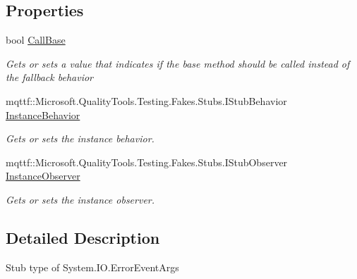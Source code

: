 \subsection*{Properties}
\begin{DoxyCompactItemize}
\item 
bool \hyperlink{class_system_1_1_i_o_1_1_fakes_1_1_stub_error_event_args_a805b5644284b21c3e82295740c538afe}{Call\-Base}
\begin{DoxyCompactList}\small\item\em Gets or sets a value that indicates if the base method should be called instead of the fallback behavior\end{DoxyCompactList}\item 
mqttf\-::\-Microsoft.\-Quality\-Tools.\-Testing.\-Fakes.\-Stubs.\-I\-Stub\-Behavior \hyperlink{class_system_1_1_i_o_1_1_fakes_1_1_stub_error_event_args_a21004becf5bc545d9a6894bc17245af5}{Instance\-Behavior}
\begin{DoxyCompactList}\small\item\em Gets or sets the instance behavior.\end{DoxyCompactList}\item 
mqttf\-::\-Microsoft.\-Quality\-Tools.\-Testing.\-Fakes.\-Stubs.\-I\-Stub\-Observer \hyperlink{class_system_1_1_i_o_1_1_fakes_1_1_stub_error_event_args_a5a6a6009c889d7bdf2b930200b57e46e}{Instance\-Observer}
\begin{DoxyCompactList}\small\item\em Gets or sets the instance observer.\end{DoxyCompactList}\end{DoxyCompactItemize}


\subsection{Detailed Description}
Stub type of System.\-I\-O.\-Error\-Event\-Args



